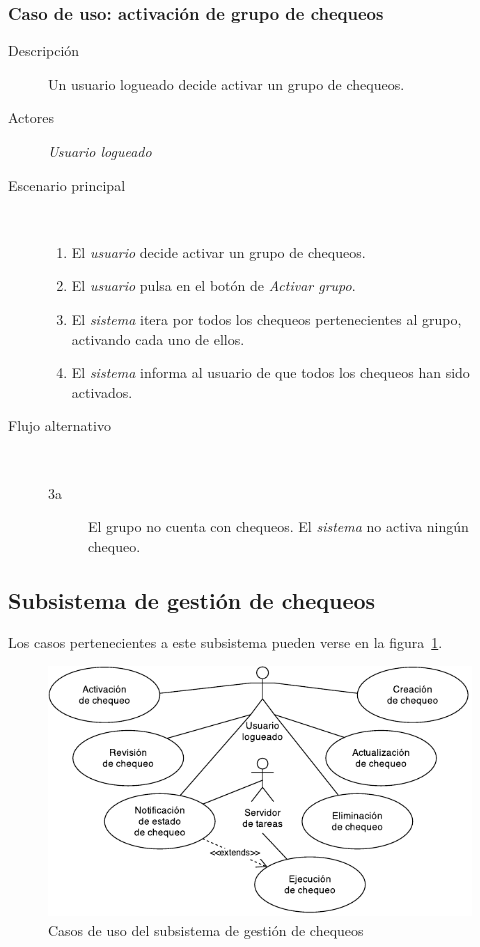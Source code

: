 \subsubsection{Caso de uso: activación de grupo de chequeos}

\begin{description}
\item[Descripción] Un usuario logueado decide activar un grupo de chequeos.
\item[Actores] \textit{Usuario logueado}
\item[Escenario principal] $\quad$
  \begin{enumerate}
  \item El \textit{usuario} decide activar un grupo de chequeos.
  \item El \textit{usuario} pulsa en el botón de \textit{Activar grupo}.
  \item El \textit{sistema} itera por todos los chequeos pertenecientes al
    grupo, activando cada uno de ellos.
  \item El \textit{sistema} informa al usuario de que todos los chequeos han
    sido activados.
  \end{enumerate}

\item[Flujo alternativo] $\quad$
  \begin{description}
  \item[3a] El grupo no cuenta con chequeos. El \textit{sistema} no activa
    ningún chequeo.
  \end{description}
\end{description}

\subsection{Subsistema de gestión de chequeos}

Los casos pertenecientes a este subsistema pueden verse en la figura~\ref{fig:subsistema-chequeos}.

\begin{figure}[htbp]
  \centering
  \includegraphics[width=\textwidth]{4_analisis/diagrama_subsistema_gestion_chequeos}
  \caption{Casos de uso del subsistema de gestión de chequeos}
  \label{fig:subsistema-chequeos}
\end{figure}

